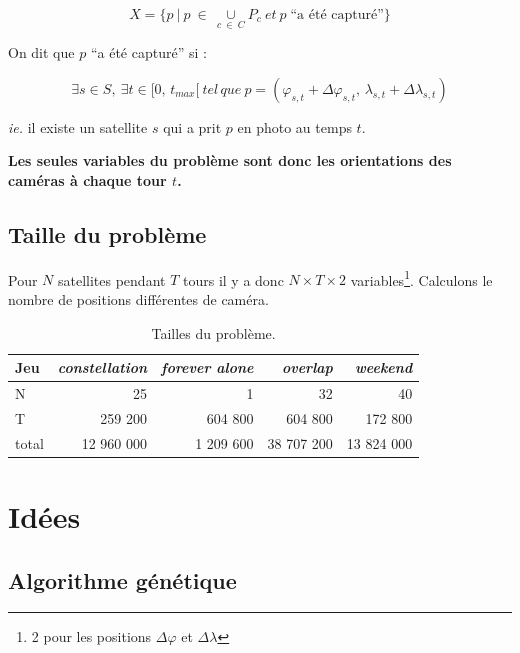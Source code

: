 \documentclass[11pt, oneside]{article}   	%
\begin{document}
\begin{equation}
	X = \{ p \ | \ p \ \in \ \underset{c \ \in \ C}\cup P_{c} \ \mathit{et} \ p
    \;  \text{``a été capturé''} \}
\end{equation}

On dit que $p$ ``a été capturé'' si :

\begin{equation}
	\exists s \in S, \ \exists t \in [0, \, t_{max}[ \ \mathit{tel \, que} \ p = (\varphi_{s, t} + \Delta\varphi_{s, t}, \, \lambda_{s, t} + \Delta\lambda_{s, t})
\end{equation}

\emph{ie.} il existe un satellite $s$ qui a prit $p$ en photo au temps $t$.


\textbf{Les seules variables du problème sont donc les orientations des
caméras à chaque tour $t$.}

\subsection{Taille du problème}

Pour $N$ satellites pendant $T$ tours il y a donc $N \times T \times
2$ variables\footnote{2 pour les positions $\Delta\varphi$ et $\Delta\lambda$}.
Calculons le nombre de positions différentes de caméra.

\begin{table}[htb]
\begin{center}
\begin{tabular}{ l | r r r r }
    Jeu & \emph{constellation} & \emph{forever alone} & \emph{overlap} &
    \emph{weekend} \\
	\hline
    N     & 25         & 1         & 32         & 40         \\
    T     & 259 200    & 604 800   & 604 800    & 172 800    \\
    total & 12 960 000 & 1 209 600 & 38 707 200 & 13 824 000 \\
\end{tabular}
\end{center}
\caption{\label{tab:taille}Tailles du problème.}
\end{table}



\section{Idées}

\subsection{Algorithme génétique}
\end{document}
